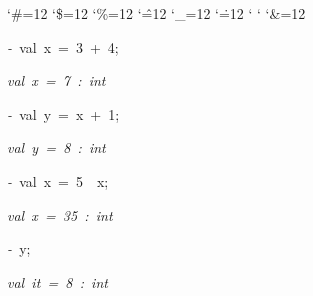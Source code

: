 \begin{list}{}
{\setlength{\leftmargin}{\leftmargini}
\setlength{\rightmargin}{0cm}
\setlength{\itemindent}{0cm}
\setlength{\listparindent}{0cm}
\setlength{\itemsep}{0cm}
\setlength{\parsep}{0cm}
\setlength{\labelsep}{0cm}
\setlength{\labelwidth}{0cm}
\catcode`\#=12
\catcode`\$=12
\catcode`\%=12
\catcode`\^=12
\catcode`\_=12
\catcode`\.=12
\catcode`
\catcode`
\catcode`\&=12
\ttfamily}
\small
\item[]\textsl{-\ }val\ x\ =\ 3\ +\ 4;
\item[]\textsl{val\ x\ =\ 7\ :\ int}
\item[]\textsl{-\ }val\ y\ =\ x\ +\ 1;
\item[]\textsl{val\ y\ =\ 8\ :\ int}
\item[]\textsl{-\ }val\ x\ =\ 5\ \ x;
\item[]\textsl{val\ x\ =\ 35\ :\ int}
\item[]\textsl{-\ }y;
\item[]\textsl{val\ it\ =\ 8\ :\ int}
\end{list}
